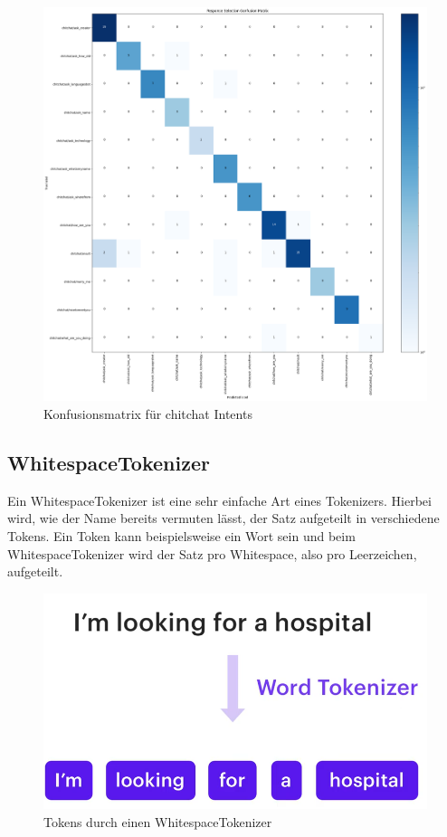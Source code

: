 \begin{figure}[hbt!]
    \centering
    \includegraphics[scale=0.3]{pics/confusion_matrix}
    \caption{Konfusionsmatrix für chitchat Intents}
    \label{fig:confusion_matrix}
\end{figure}

\subsection{WhitespaceTokenizer}\label{subsec:whitespace-tokenizer}

Ein WhitespaceTokenizer ist eine sehr einfache Art eines Tokenizers.
Hierbei wird, wie der Name bereits vermuten lässt, der Satz aufgeteilt in verschiedene Tokens.
Ein Token kann beispielsweise ein Wort sein und beim WhitespaceTokenizer wird der Satz pro Whitespace, also pro Leerzeichen, aufgeteilt.\cite{whitespaceTokenizer, rasaMasterclassWhitespaceTokenizer, pipelineComponentsYoutube}

\begin{figure}[hbt!]
    \centering
    \includegraphics[scale=0.25]{pics/whitespacetokenizer}
    \caption{Tokens durch einen WhitespaceTokenizer~\cite{pipelineComponentsYoutube}}
    \label{fig:WhitespaceTokenizer}
\end{figure}

